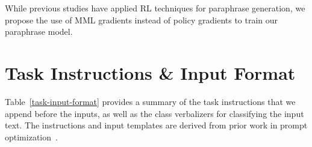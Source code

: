 \documentclass[11pt]{article}
\begin{document}
While previous studies have applied RL techniques for paraphrase generation, we propose the use of MML gradients instead of policy gradients to train our paraphrase model.

\section{Task Instructions \& Input Format}
\label{task-instruct-input-format:appendix}
Table~\ref{task-input-format} provides a summary of the task instructions that we append before the inputs, as well as the class verbalizers for classifying the input text. The instructions and input templates are derived from prior work in prompt optimization~\cite{deng-etal-2022-rlprompt}.

\end{document}
